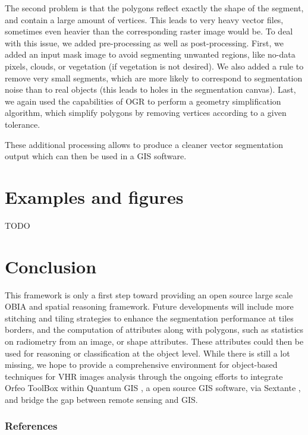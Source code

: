 \documentclass{josis}
\begin{document}
The second problem is that the polygons reflect exactly the shape of
the segment, and contain a large amount of vertices. This leads to
very heavy vector files, sometimes even heavier than the corresponding
raster image would be. To deal with this issue, we added
pre-processing as well as post-processing. First, we added an input
mask image to avoid segmenting unwanted regions, like no-data
pixels, clouds, or vegetation (if vegetation is not desired). We also
added a rule to remove very small segments, which are more likely to
correspond to segmentation noise than to real objects (this leads to
holes in the segmentation canvas). Last, we again used the
capabilities of OGR to perform a geometry simplification algorithm,
which simplify polygons by removing vertices according to a given
tolerance.

These additional processing allows to produce a cleaner vector
segmentation output which can then be used in a GIS software.


\section{Examples and figures}

TODO

\section{Conclusion}

  This framework is only a first step toward providing an open source
 large scale OBIA and spatial reasoning framework. Future developments
 will include more stitching and tiling strategies to enhance the
 segmentation performance at tiles borders, and the computation of
 attributes along with polygons, such as statistics on radiometry from
 an image, or shape attributes. These attributes could then be used
 for reasoning or classification at the object level. While there is
 still a lot missing, we hope to provide a comprehensive environment
 for object-based techniques for VHR images analysis through the
 ongoing efforts to integrate Orfeo ToolBox within Quantum
 GIS \cite{}, a open source GIS software, via Sextante \cite{},
 and bridge the gap between remote sensing and GIS.


\subsubsection{References}



\end{document}
